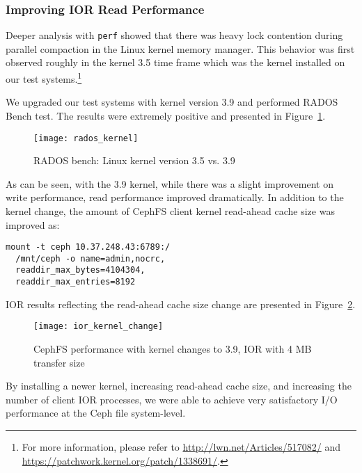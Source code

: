 \subsubsection{Improving IOR Read Performance}

Deeper analysis with \verb!perf! showed that there was heavy lock contention during
parallel compaction in the Linux kernel memory manager.  This behavior was first
observed roughly in the kernel 3.5 time frame which was the kernel
installed on our test systems.\footnote{For more information,
please refer to \url{http://lwn.net/Articles/517082/} and
\url{https://patchwork.kernel.org/patch/1338691/}.}

We upgraded our test systems with kernel version 3.9 and performed RADOS Bench
test.  The results were extremely positive and presented in
Figure~\ref{fig:rados-kernel}.


\begin{figure}[htb]
\centering
\texttt{[image: rados\_kernel]}
\caption{RADOS bench: Linux kernel version 3.5 vs. 3.9}
\label{fig:rados-kernel}
\end{figure}



As can be seen, with the 3.9 kernel, while there was a slight improvement on
write performance, read performance improved dramatically.  In addition to the
kernel change, the amount of CephFS
client kernel read-ahead cache size was improved as:

\begin{Verbatim}[samepage=true, fontsize=\small]
mount -t ceph 10.37.248.43:6789:/ 
  /mnt/ceph -o name=admin,nocrc,
  readdir_max_bytes=4104304,
  readdir_max_entries=8192
\end{Verbatim}


IOR results reflecting the read-ahead cache size change are presented in
Figure~\ref{fig:ior-kernel-39}.

\begin{figure}[htb]
\centering
\texttt{[image: ior\_kernel\_change]}
\caption{CephFS performance with kernel changes to 3.9, IOR with 4 MB transfer
size}
\label{fig:ior-kernel-39}
\end{figure}


By installing a newer kernel, increasing read-ahead cache size, and increasing
the number of client IOR processes, we were able to achieve very satisfactory
I/O performance at the Ceph file system-level.


